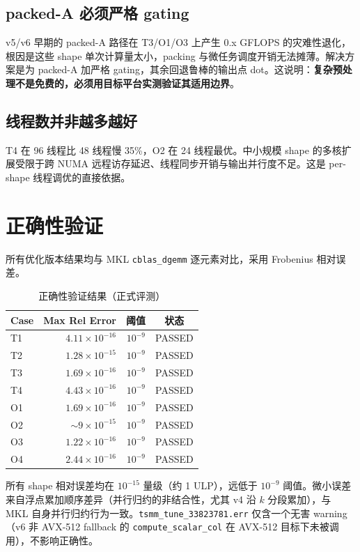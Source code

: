 \documentclass[11pt,a4paper,fontset=fandol]{ctexart}
\begin{document}
\subsection{packed-A 必须严格 gating}
v5/v6 早期的 packed-A 路径在 T3/O1/O3 上产生 0.x GFLOPS 的灾难性退化，根因是这些 shape 单次计算量太小，packing 与微任务调度开销无法摊薄。解决方案是为 packed-A 加严格 gating，其余回退鲁棒的输出点 dot。这说明：\textbf{复杂预处理不是免费的，必须用目标平台实测验证其适用边界}。

\subsection{线程数并非越多越好}
T4 在 96 线程比 48 线程慢 35\%，O2 在 24 线程最优。中小规模 shape 的多核扩展受限于跨 NUMA 远程访存延迟、线程同步开销与输出并行度不足。这是 per-shape 线程调优的直接依据。

\section{正确性验证}
所有优化版本结果均与 MKL \texttt{cblas\_dgemm} 逐元素对比，采用 Frobenius 相对误差。
\begin{table}[H]
\centering
\caption{正确性验证结果（正式评测）}
\small
\begin{tabular}{lrrc}
\toprule
Case & Max Rel Error & 阈值 & 状态 \\
\midrule
T1 & $4.11\times10^{-16}$ & $10^{-9}$ & PASSED \\
T2 & $1.28\times10^{-15}$ & $10^{-9}$ & PASSED \\
T3 & $1.69\times10^{-16}$ & $10^{-9}$ & PASSED \\
T4 & $4.43\times10^{-16}$ & $10^{-9}$ & PASSED \\
O1 & $1.69\times10^{-16}$ & $10^{-9}$ & PASSED \\
O2 & $\sim 9\times10^{-15}$ & $10^{-9}$ & PASSED \\
O3 & $1.22\times10^{-16}$ & $10^{-9}$ & PASSED \\
O4 & $2.44\times10^{-16}$ & $10^{-9}$ & PASSED \\
\bottomrule
\end{tabular}
\end{table}
所有 shape 相对误差均在 $10^{-15}$ 量级（约 1 ULP），远低于 $10^{-9}$ 阈值。微小误差来自浮点累加顺序差异（并行归约的非结合性，尤其 v4 沿 $k$ 分段累加），与 MKL 自身并行归约行为一致。\texttt{tsmm\_tune\_33823781.err} 仅含一个无害 warning（v6 非 AVX-512 fallback 的 \texttt{compute\_scalar\_col} 在 AVX-512 目标下未被调用），不影响正确性。
\end{document}
